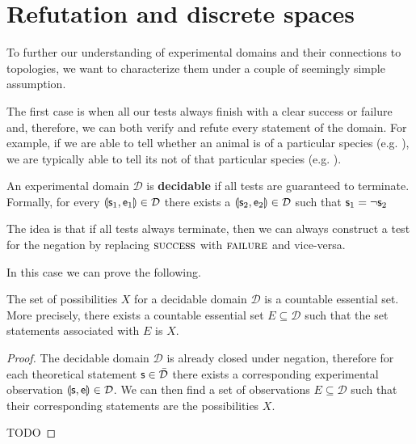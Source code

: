 \documentclass[11pt,letterpaper,fleqn]{memoir} %
\begin{document}
\section{Refutation and discrete spaces}

To further our understanding of experimental domains and their connections to topologies, we want to characterize them under a couple of seemingly simple assumption.

The first case is when all our tests always finish with a clear success or failure and, therefore, we can both verify and refute every statement of the domain. For example, if we are able to tell whether an animal is of a particular species (e.g. ), we are typically able to tell its not of that particular species (e.g. ).

\begin{mathSection}
	
	\begin{defn}
		An experimental domain $\mathcal{D}$ is \textbf{decidable} if all tests are guaranteed to terminate. Formally, for every $\llparenthesis \mathsf{s}_1, \mathsf{e}_1 \rrparenthesis \in \mathcal{D}$ there exists a $\llparenthesis \mathsf{s}_2, \mathsf{e}_2 \rrparenthesis \in \mathcal{D}$ such that $\mathsf{s}_1 = \neg \mathsf{s}_2$
	\end{defn}

	\begin{justification}
		The idea is that if all tests always terminate, then we can always construct a test for the negation by replacing $\textsc{success}$ with $\textsc{failure}$ and vice-versa.
	\end{justification}
	
\end{mathSection}

In this case we can prove the following.

\begin{mathSection}
	
	\begin{prop}
		The set of possibilities $X$ for a decidable domain $\mathcal{D}$ is a countable essential set. More precisely, there exists a countable essential set $E \subseteq \mathcal{D}$ such that the set statements associated with $E$ is $X$.
	\end{prop}
	
	\begin{proof}
		The decidable domain $\mathcal{D}$ is already closed under negation, therefore for each theoretical statement $\mathsf{s} \in \bar{\mathcal{D}}$ there exists a corresponding experimental observation $\llparenthesis \mathsf{s}, \mathsf{e} \rrparenthesis \in \mathcal{D}$. We can then find a set of observations $E\subseteq \mathcal{D}$ such that their corresponding statements are the possibilities $X$.
		
		TODO
	\end{proof}
	
\end{mathSection}
\end{document}
